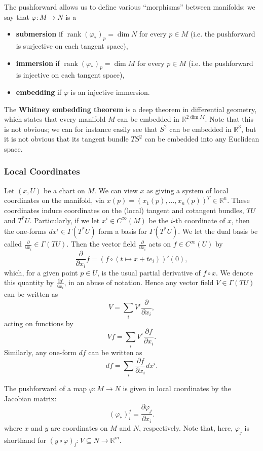 \documentclass[reqno]{amsart}
\numberwithin{equation}{section}
\begin{document}
The pushforward allows us to define various ``morphisms'' between manifolds: we say that $\varphi: M \to N$ is a
\begin{itemize}
    \item \textbf{submersion} if $\operatorname{rank}(\varphi_*)_p = \dim N$ for every $p \in M$
    (i.e. the pushforward is surjective on each tangent space),
    \item \textbf{immersion} if $\operatorname{rank}(\varphi_*)_p = \dim M$ for every $p \in M$
    (i.e. the pushforward is injective on each tangent space),
    \item \textbf{embedding} if $\varphi$ is an injective immersion.
\end{itemize}
The \textbf{Whitney embedding theorem} is a deep theorem in differential geometry, which
states that every manifold $M$ can be embedded in $\mathbb R^{2 \dim M}$. Note that this is not obvious;
we can for instance easily see that $S^2$ can be embedded in $\mathbb R^3$, but it is not obvious that its
tangent bundle $TS^2$ can be embedded into any Euclidean space.

\subsubsection{Local Coordinates}

Let $(x, U)$ be a chart on $M$. We can view $x$ as giving a system of local coordinates on the manifold, via
$x(p) = (x_1(p), \ldots, x_n(p))^T \in \mathbb R^n$.
These coordinates induce
coordinates on the (local) tangent and cotangent bundles, $TU$ and $T^*U$. Particularly, if we let
$x^i \in C^{\infty}(M)$ be the $i$-th coordinate of $x$, then the one-forms $dx^i \in \Gamma(T^*U)$ form a basis for
$\Gamma(T^*U)$. We let the dual basis be called $\frac{\partial}{\partial x_i} \in \Gamma(TU)$. Then the vector
field $\frac{\partial}{\partial x_i}$ acts on $f \in C^{\infty}(U)$ by
$$
    \frac{\partial}{\partial x_i} f = (f \circ (t \mapsto x  + t e_i))'(0),
$$
which, for a given point $p \in U$, is the usual partial derivative of $f \circ x$. We denote this quantity by
$\frac{\partial f}{\partial x_i}$, in an abuse of notation. Hence any vector field $V \in \Gamma(TU)$ can be written
as
$$
    V = \sum_i V^i \frac{\partial}{\partial x_i},
$$
acting on functions by
$$
    Vf = \sum_i V^i \frac{\partial f}{\partial x_i}.
$$
Similarly, any one-form $df$ can be written as
$$
    df = \sum_i \frac{\partial f}{\partial x_i} dx^i.
$$

The pushforward of a map $\varphi : M \to N$ is given in local coordinates by the Jacobian matrix:
$$
    (\varphi_*)_i^j = \frac{\partial \varphi_j}{\partial x_i}.
$$
where $x$ and $y$ are coordinates on $M$ and $N$, respectively.
Note that, here, $\varphi_j$ is shorthand for $(y \circ \varphi)_j : V \subseteq N \to \mathbb R^m$.
\end{document}
